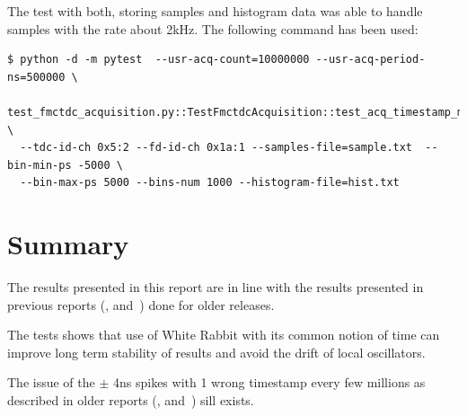\documentclass[a4paper, 12pt]{article}
\begin{document}
The test with both, storing samples and histogram data was able to handle
samples with the rate about 2kHz. The following command has been used:
\begin{lstlisting}
$ python -d -m pytest  --usr-acq-count=10000000 --usr-acq-period-ns=500000 \
  test_fmctdc_acquisition.py::TestFmctdcAcquisition::test_acq_timestamp_multiple_hist \
  --tdc-id-ch 0x5:2 --fd-id-ch 0x1a:1 --samples-file=sample.txt  --bin-min-ps -5000 \
  --bin-max-ps 5000 --bins-num 1000 --histogram-file=hist.txt
\end{lstlisting}

\section{Summary}
\label{Summary}
The results presented in this report are in line with the results presented
in previous reports (\cite{tdc_perf_test}, \cite{tdc_precision_test}
and~\cite{tdc_long_runs}) done for older releases.

The tests shows that use of White Rabbit with its common notion of time
can improve long term stability of results and avoid the drift of local
oscillators.

The issue of the $\pm$ 4ns spikes with 1 wrong timestamp every few millions
as described in older reports (\cite{tdc_perf_test}, \cite{tdc_precision_test}
and~\cite{tdc_long_runs}) sill exists.

\end{document}
